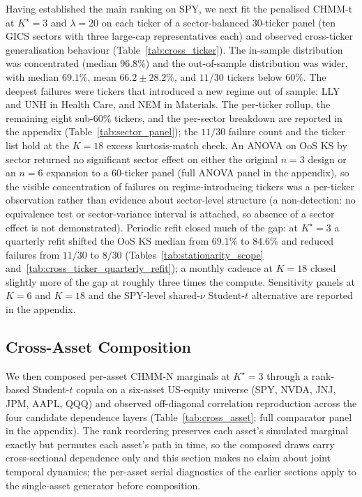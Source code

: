 Having established the main ranking on SPY, we next fit the penalised CHMM-t at $K^\star = 3$ and $\lambda = 20$ on each ticker of a sector-balanced 30-ticker panel (ten GICS sectors with three large-cap representatives each) and observed cross-ticker generalisation behaviour (Table~\ref{tab:cross_ticker}). The in-sample distribution was concentrated (median $96.8\%$) and the out-of-sample distribution was wider, with median $69.1\%$, mean $66.2 \pm 28.2\%$, and $11/30$ tickers below $60\%$. The deepest failures were tickers that introduced a new regime out of sample: LLY and UNH in Health Care, and NEM in Materials. The per-ticker rollup, the remaining eight sub-$60\%$ tickers, and the per-sector breakdown are reported in the appendix (Table~\ref{tab:sector_panel}); the $11/30$ failure count and the ticker list hold at the $K = 18$ excess kurtosis-match check. An ANOVA on OoS KS by sector returned no significant sector effect on either the original $n = 3$ design or an $n = 6$ expansion to a 60-ticker panel (full ANOVA panel in the appendix), so the visible concentration of failures on regime-introducing tickers was a per-ticker observation rather than evidence about sector-level structure (a non-detection: no equivalence test or sector-variance interval is attached, so absence of a sector effect is not demonstrated). Periodic refit closed much of the gap: at $K^\star = 3$ a quarterly refit shifted the OoS KS median from $69.1\%$ to $84.6\%$ and reduced failures from $11/30$ to $8/30$ (Tables~\ref{tab:stationarity_scope} and~\ref{tab:cross_ticker_quarterly_refit}); a monthly cadence at $K = 18$ closed slightly more of the gap at roughly three times the compute. Sensitivity panels at $K = 6$ and $K = 18$ and the SPY-level shared-$\nu$ Student-$t$ alternative are reported in the appendix.

\subsection{Cross-Asset Composition}

We then composed per-asset CHMM-N marginals at $K^\star = 3$ through a rank-based Student-$t$ copula on a six-asset US-equity universe (SPY, NVDA, JNJ, JPM, AAPL, QQQ) and observed off-diagonal correlation reproduction across the four candidate dependence layers (Table~\ref{tab:cross_asset}; full comparator panel in the appendix). The rank reordering preserves each asset's simulated marginal exactly but permutes each asset's path in time, so the composed draws carry cross-sectional dependence only and this section makes no claim about joint temporal dynamics; the per-asset serial diagnostics of the earlier sections apply to the single-asset generator before composition.

